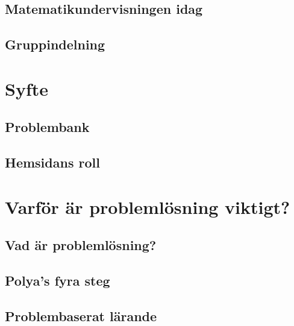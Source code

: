 \documentclass[11pt,a4paper]{article}
\begin{document}
    \subsection{Matematikundervisningen idag}
        
        
    \subsection{Gruppindelning}
        \label{sec:Gruppindelning}
        

\section{Syfte}
    
    
    \subsection{Problembank}
        
    
    \subsection{Hemsidans roll}
        
\section{Varför är problemlösning viktigt?}
    \label{sec:Teori}
    
        
    \subsection{Vad är problemlösning?}
        \label{sec:problemdef}
        
        
    \subsection{Polya's fyra steg}
        \label{sec:polya}
        
        
    \subsection{Problembaserat lärande}
        
        
\end{document}
